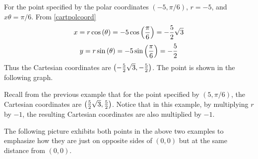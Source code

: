 \begin{solution}
For the point specified by the polar coordinates $\left( -5, \pi /6 \right)$,
$r=-5$, and $x\theta = \pi /6$. 
From \ref{cartpolcoord}
\[
x= r \cos \left( \theta \right)= -5\cos \left( \vspace{0.05in}\frac{\pi }{6}\right) = -\vspace{0.05in}\frac{5}{2}\sqrt{3}
\]
\[
y= r \sin \left( \theta \right) = -5\sin \left( \vspace{0.05in}\frac{\pi }{6}\right) = -\vspace{0.05in}\frac{5}{2}
\]
Thus the Cartesian coordinates are $\left( -\vspace{0.05in}\frac{5}{2}\sqrt{3}, -\vspace{0.05in}\frac{5}{2}\right)$. The point is shown in the following graph.

\begin{center}
\end{center}

Recall from the previous example that for the point specified by $\left( 5, \pi /6 \right)$, the Cartesian coordinates are $\left( \vspace{0.05in}\frac{5}{2}\sqrt{3}, \vspace{0.05in}\frac{5}{2}\right)$. Notice that in this example, by multiplying $r$ by $-1$, the resulting Cartesian coordinates are also multiplied by $-1$. 
\end{solution}

The following picture exhibits both points in the above two examples to
emphasize how they are just on opposite sides of $\left( 0,0\right) $ but at
the same distance from $\left( 0,0\right) $.

\begin{center}
\end{center}

